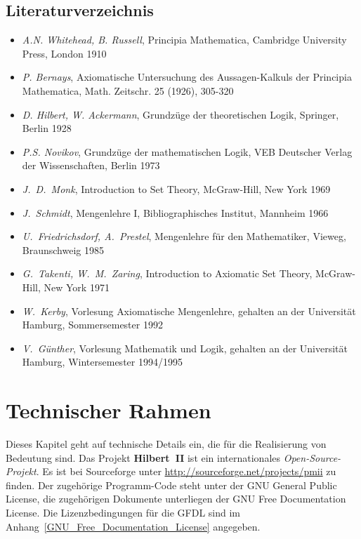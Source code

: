 \documentclass[a4paper,german,10pt,twoside]{book}
\begin{document}
{\section{Literaturverzeichnis}
\begin{itemize}
 \item \emph{A.N. Whitehead, B. Russell}, Principia Mathematica, Cambridge University Press, London
1910
 \item \emph{P. Bernays}, Axiomatische Untersuchung des Aussagen-Kalkuls der {\glqq Principia
Mathematica\grqq}, Math. Zeitschr. 25 (1926), 305-320
 \item \emph{D. Hilbert, W. Ackermann}, Grundz{\"u}ge der theoretischen Logik, Springer, Berlin 1928
 \item \emph{P.S. Novikov}, Grundz{\"u}ge der mathematischen Logik, VEB Deutscher Verlag der Wissenschaften, Berlin 1973
 \item \emph{J.~D.~Monk}, Introduction to Set Theory, McGraw-Hill, New York 1969
 \item \emph{J.~Schmidt}, Mengenlehre I, Bibliographisches Institut, Mannheim 1966
 \item \emph{U.~Friedrichsdorf, A.~Prestel}, Mengenlehre f{\"u}r den Mathematiker, Vieweg,
  Braunschweig 1985
 \item \emph{G.~Takenti, W.~M.~Zaring}, Introduction to Axiomatic Set Theory,
  McGraw-Hill, New York 1971
 \item \emph{W.~Kerby}, Vorlesung {\glqq Axiomatische Mengenlehre\grqq}, gehalten an der Universit{\"a}t Hamburg, Sommersemester 1992
 \item \emph{V.~G{\"u}nther}, Vorlesung {\glqq Mathematik und Logik\grqq}, gehalten an der Universit{\"a}t Hamburg, Wintersemester
 1994/1995
\end{itemize}


\chapter{Technischer Rahmen} \label{Technischer_Rahmen}

Dieses Kapitel geht auf technische Details ein, die f{\"u}r die Realisierung von Bedeutung sind. Das
Projekt \textbf{Hilbert~II} ist ein internationales \emph{Open-Source-Projekt}. Es ist bei
Sourceforge unter \url{http://sourceforge.net/projects/pmii} zu finden. Der zugeh{\"o}rige
Programm-Code steht unter der GNU General Public License, die zugeh{\"o}rigen Dokumente
unterliegen der GNU Free Documentation License. Die Lizenzbedingungen f{\"u}r die GFDL sind im
Anhang~\ref{GNU_Free_Documentation_License} angegeben.

}
\end{document}
